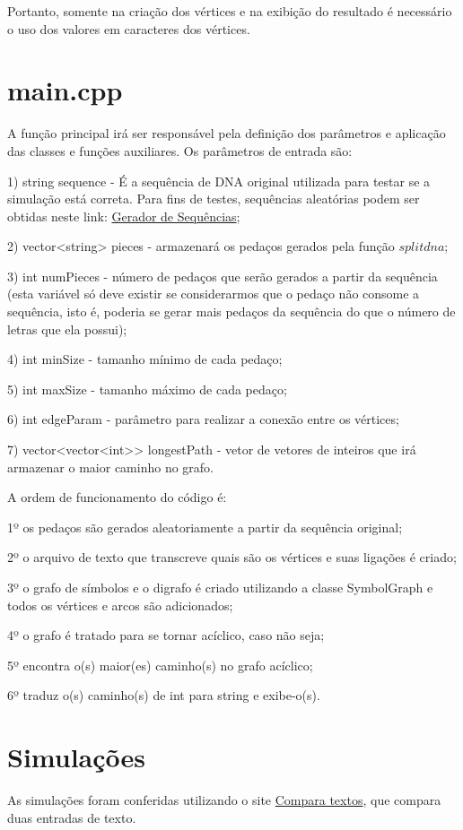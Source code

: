 \documentclass{article}
\begin{document}
\begin{multicols}{2}
Portanto, somente na criação dos vértices e na exibição do resultado é necessário o uso dos valores em caracteres dos vértices.

\section{main.cpp}
A função principal irá ser responsável pela definição dos parâmetros e aplicação das classes e funções auxiliares. Os parâmetros de entrada são:

1) string sequence - É a sequência de DNA original utilizada para testar se a simulação está correta. Para fins de testes, sequências aleatórias podem ser obtidas neste link: \href{http://www.faculty.ucr.edu/~mmaduro/random.htm}{Gerador de Sequências};

2) vector<string> pieces - armazenará os pedaços gerados pela função $splitdna$;

3) int numPieces - número de pedaços que serão gerados a partir da sequência (esta variável só deve existir se considerarmos que o pedaço não consome a sequência, isto é, poderia se gerar mais pedaços da sequência do que o número de letras que ela possui);

4) int minSize - tamanho mínimo de cada pedaço;

5) int maxSize - tamanho máximo de cada pedaço;

6) int edgeParam - parâmetro para realizar a conexão entre os vértices;

7) vector<vector<int>> longestPath - vetor de vetores de inteiros que irá armazenar o maior caminho no grafo.

A ordem de funcionamento do código é:

 1º os pedaços são gerados aleatoriamente a partir da sequência original;
 
 2º o arquivo de texto que transcreve quais são os vértices e suas ligações é criado;
 
 3º o grafo de símbolos e o digrafo é criado utilizando a classe SymbolGraph e todos os vértices e arcos são adicionados;
 
 4º o grafo é tratado para se tornar acíclico, caso não seja;
 
 5º encontra o(s) maior(es) caminho(s) no grafo acíclico;
 
 6º traduz o(s) caminho(s) de int para string e exibe-o(s).

\section{Simulações}
As simulações foram conferidas utilizando o site \href{https://globalvision.co/tools/compare-text/}{Compara textos}, que compara duas entradas de texto.


\end{multicols}
\end{document}
